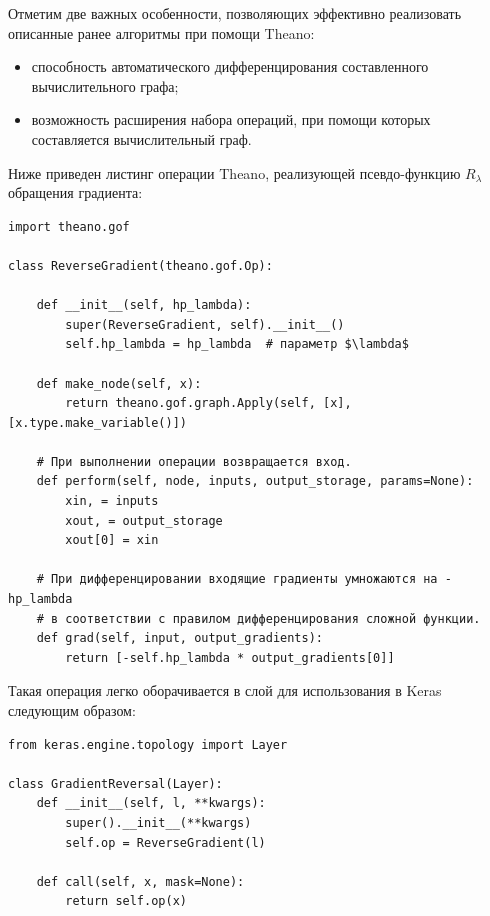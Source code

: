 \documentclass[14pt, a4paper]{extarticle}
\begin{document}
Отметим две важных особенности, позволяющих эффективно реализовать описанные ранее алгоритмы при помощи Theano:
\begin{itemize}
	\item способность автоматического дифференцирования составленного вычислительного графа;
	\item возможность расширения набора операций, при помощи которых составляется вычислительный граф. 
\end{itemize} 

Ниже приведен листинг операции Theano, реализующей псевдо-функцию $R_{\lambda}$ обращения градиента:
\begin{verbatim}
import theano.gof

class ReverseGradient(theano.gof.Op):

    def __init__(self, hp_lambda):
        super(ReverseGradient, self).__init__()
        self.hp_lambda = hp_lambda  # параметр $\lambda$

    def make_node(self, x):
        return theano.gof.graph.Apply(self, [x], [x.type.make_variable()])

    # При выполнении операции возвращается вход.
    def perform(self, node, inputs, output_storage, params=None):
        xin, = inputs
        xout, = output_storage
        xout[0] = xin

    # При дифференцировании входящие градиенты умножаются на -hp_lambda
    # в соответствии с правилом дифференцирования сложной функции.
    def grad(self, input, output_gradients):
        return [-self.hp_lambda * output_gradients[0]]
\end{verbatim}

Такая операция легко оборачивается в слой для использования в Keras следующим образом: \\
\begin{verbatim}
from keras.engine.topology import Layer

class GradientReversal(Layer):
    def __init__(self, l, **kwargs):
        super().__init__(**kwargs)
        self.op = ReverseGradient(l)

    def call(self, x, mask=None):
        return self.op(x)
\end{verbatim}
\end{document}
